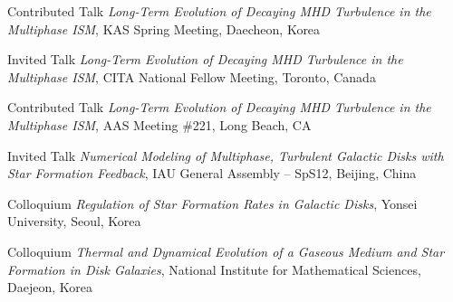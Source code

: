 \documentclass[12pt]{article}
\begin{document}
{Contributed Talk}
{\emph{Long-Term Evolution of Decaying MHD Turbulence in the Multiphase ISM},
KAS Spring Meeting,
Daecheon, Korea}

{Invited Talk}
{\emph{Long-Term Evolution of Decaying MHD Turbulence in the Multiphase ISM},
CITA National Fellow Meeting,
Toronto, Canada}

{Contributed Talk}
{\emph{Long-Term Evolution of Decaying MHD Turbulence in the Multiphase ISM},
AAS Meeting \#221,
Long Beach, CA}

{Invited Talk}
{\emph{Numerical Modeling of Multiphase, Turbulent Galactic Disks with Star Formation Feedback},
IAU General Assembly -- SpS12,
Beijing, China}

{Colloquium}
{\emph{Regulation of Star Formation Rates in Galactic Disks},
Yonsei University,
Seoul, Korea}

{Colloquium}
{\emph{Thermal and Dynamical Evolution of a Gaseous Medium and Star Formation in Disk Galaxies},
National Institute for Mathematical Sciences,
Daejeon, Korea}
\end{document}
